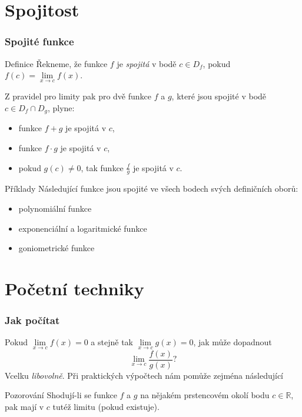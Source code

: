 \documentclass[handout]%
{beamer}
\newcommand{\R}{\mathbb R}
\begin{document}
\section{Spojitost}


\begin{frame}
	\frametitle{Spojité funkce}
	\begin{block}{Definice}
	Řekneme, že funkce $f$ je \emph{spojitá} v bodě $c \in D_f$, pokud $f(c) = \lim\limits_{x \to c} f(x)$.
	\end{block}
	\pause \medskip
	Z pravidel pro limity pak pro dvě funkce $f$ a $g$, které jsou spojité v bodě $c \in D_f \cap D_g$, plyne:\pause
	\begin{itemize}
		\item funkce $f + g$ je spojitá v $c$,\pause
		\item funkce $f \cdot g$ je spojitá v $c$,\pause
		\item pokud $g(c)\neq 0$, tak funkce $\frac fg$ je spojitá v $c$.
	\end{itemize}
	
	\pause
	\begin{exampleblock}{Příklady}
	Následující funkce jsou spojité ve všech bodech svých definičních oborů:
	\pause
	\begin{itemize}
		\item polynomiální funkce \pause%
		\item exponenciální a logaritmické funkce \pause
		\item goniometrické funkce
	\end{itemize}
	\end{exampleblock}
	
\end{frame}

\section{Početní techniky}

\begin{frame}
	\frametitle{Jak počítat }
	Pokud $\lim\limits_{x \to c}f(x) = 0$ a stejně tak $\lim\limits_{x \to c}g(x) = 0$, jak může dopadnout
	\[ \lim\limits_{x \to c}\frac{f(x)}{g(x)}? \]
	\pause
	Vcelku \emph{libovolně}. \pause Při praktických výpočtech nám pomůže zejména následující
	
	\begin{block}{Pozorování}\pause
	Shodují-li se funkce $f$ a $g$ na nějakém prstencovém okolí bodu $c \in \R$, pak mají v $c$ tutéž limitu (pokud existuje).
	\end{block}

\end{frame}
\end{document}
